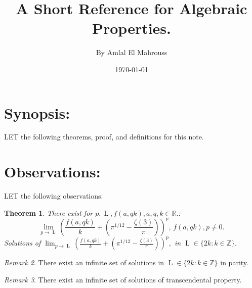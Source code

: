 \documentclass[10pt]{article}
\title{%
	\vspace{-1.5em}%
	\large\textbf{A Short Reference for Algebraic Properties.}%
}
\author{By Amlal El Mahrouss}
\date{\today}
\theoremstyle{plain}
\newtheorem{theorem}{Theorem}[section]
\theoremstyle{definition}
\theoremstyle{remark}
\newtheorem{remark}[theorem]{Remark}
\begin{document}

\maketitle
\tableofcontents
\newpage

\section{Synopsis:}

\lettrine[lines=1, lhang=0.1, loversize=0.2]{L}ET the following theorems, proof, and definitions for this note.

\section{Observations:}

\lettrine[lines=1, lhang=0.1, loversize=0.2]{L}ET the following observations:

\begin{theorem}
	There exist for $p, \operatorname{L}, f(a, qk), a, q, k \in \mathbb{R}.$:
	\begin{equation}
		\lim_{p \to \operatorname{L}} (\frac{f(a, qk)}{k} + (\pi^{1/12} - \frac{\zeta(3)}{\pi}))^p, \, f(a, qk), p \neq 0.
	\end{equation}
	Solutions of $\lim_{p \to \operatorname{L}} (\frac{f(a, qk)}{k} + (\pi^{1/12} - \frac{\zeta(3)}{\pi}))^p,$ in  $\operatorname{L} \in \{2k : k \in \mathbb{Z}\}.$
\end{theorem}
\begin{remark}
	There exist an infinite set of solutions in $\operatorname{L} \in \{2k : k \in \mathbb{Z}\}$ in parity.
\end{remark}
\begin{remark}
There exist an infinite set of solutions of transcendental property.
\end{remark}
\end{document}
